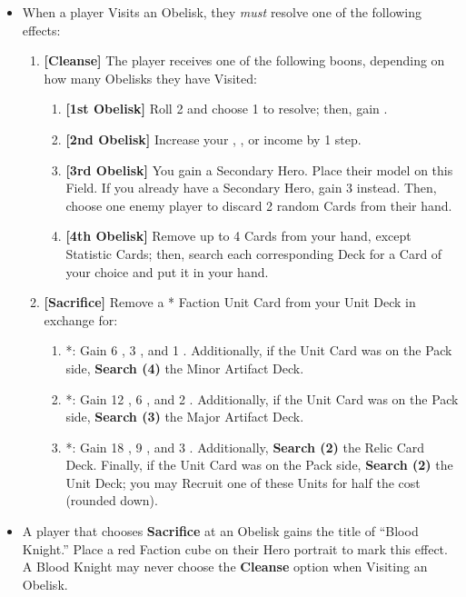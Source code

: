 \begin{multicols*}{2}
\begin{itemize}
  \item When a player Visits an Obelisk, they \textit{must} resolve one of the following effects:
  \begin{enumerate}[leftmargin=15pt]
    \item \textbf{[Cleanse]} The player receives one of the following boons, depending on how many Obelisks they have Visited:
    \begin{enumerate}
      \item \textbf{[1st Obelisk]} Roll 2  and choose 1 to resolve; then, gain .
      \item \textbf{[2nd Obelisk]} Increase your , , or  income by 1 step.
      \item \textbf{[3rd Obelisk]} You gain a Secondary Hero. Place their model on this Field. If you already have a Secondary Hero, gain 3  instead. Then, choose one enemy player to discard 2 random Cards from their hand.
      \item \textbf{[4th Obelisk]} Remove up to 4 Cards from your hand, except Statistic Cards; then, search each corresponding Deck for a Card of your choice and put it in your hand.
    \end{enumerate}
    \item \textbf{[Sacrifice]} Remove a * Faction Unit Card from your Unit Deck in exchange for:
    \begin{enumerate}
      \item *: Gain 6 , 3 , and 1 . Additionally, if the Unit Card was on the Pack side, \textbf{Search (4)} the Minor Artifact Deck.
      \item *: Gain 12 , 6 , and 2 . Additionally, if the Unit Card was on the Pack side, \textbf{Search (3)} the Major Artifact Deck.
      \item *: Gain 18 , 9 , and 3 . Additionally, \textbf{Search (2)} the Relic Card Deck. Finally, if the Unit Card was on the Pack side, \textbf{Search (2)} the  Unit Deck; you may Recruit one of these Units for half the cost (rounded down).
    \end{enumerate}
  \end{enumerate}
  \item A player that chooses \textbf{Sacrifice} at an Obelisk gains the title of ``\textcolor{darkcandyapplered}{Blood Knight}.'' Place a red Faction cube on their Hero portrait to mark this effect. A \textcolor{darkcandyapplered}{Blood Knight} may never choose the \textbf{Cleanse} option when Visiting an Obelisk.

\end{itemize}
\end{multicols*}
